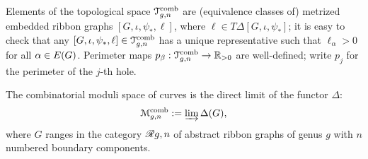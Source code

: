 Elements of the topological space $\mathcal{T}\sp{\text{comb}}_{g,n}$ are (equivalence
classes of) metrized embedded ribbon graphs $[G, \iota, \psi_*, \ell]$, where $\ell
\in T\Delta[G, \iota, \psi_*]$; it is easy to check that any $[G, \iota, \psi_*, \ell] \in
\mathcal{T}\sp{\text{comb}}_{g,n}$ has a unique representative such that $\ell_\alpha > 0$ for all
$\alpha \in E(G)$.  Perimeter maps $p_\beta: \mathcal{T}\sp{\text{comb}}_{g,n} \to \mathbb{R}_{>0}$ are
well-defined; write $p_j$ for the perimeter of the $j$-th hole.

\begin{definition}
  The combinatorial moduli space of curves is the direct limit of the
  functor $\Delta$:
  \begin{equation*}
    \mathcal{M}\sp{\text{comb}}_{g,n} := \varinjlim \Delta(G),
  \end{equation*}
  where $G$ ranges in the category $\mathscr{R}_{}{g,n}$ of abstract ribbon
  graphs of genus $g$ with $n$ numbered boundary components.
\end{definition}

